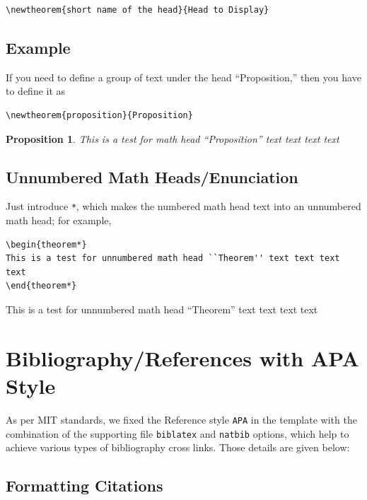 \documentclass[]{imag-ms-template}
\begin{document}
\begin{verbatim}
\newtheorem{short name of the head}{Head to Display}
\end{verbatim}

\subsection*{Example}

If you need to define a group of text under the head ``Proposition,''
then you have to define it as 

\begin{verbatim}
\newtheorem{proposition}{Proposition}
\end{verbatim}

\newtheorem{proposition}{Proposition}
\begin{proposition}
This is a test for math head ``Proposition'' text text text text
\end{proposition}

\subsection{Unnumbered Math Heads/Enunciation}

Just introduce \verb!*!, which makes the numbered math head text
into an unnumbered math head; for example,

\begin{verbatim}
\begin{theorem*}
This is a test for unnumbered math head ``Theorem'' text text text text
\end{theorem*}
\end{verbatim}

\begin{theorem*}
This is a test for unnumbered math head ``Theorem'' text text text text
\end{theorem*}

\section{Bibliography/References with APA Style}

As per MIT standards, we fixed the Reference style \verb!APA! in
the template with the combination of the supporting file
\verb!biblatex! and \verb!natbib! options, which
help to achieve various types of bibliography cross links. Those details are given below:

\subsection{Formatting Citations}
\end{document}
